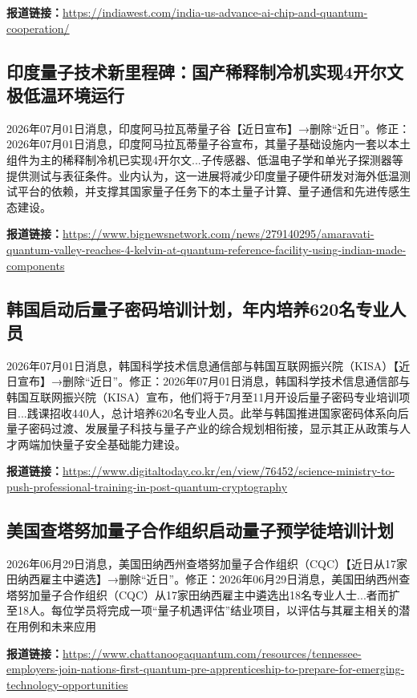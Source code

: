 \documentclass[12pt,a4paper]{ctexart}
\begin{document}
\noindent\textbf{报道链接：}\url{https://indiawest.com/india-us-advance-ai-chip-and-quantum-cooperation/}

\subsection{ 印度量子技术新里程碑：国产稀释制冷机实现4开尔文极低温环境运行 }

2026年07月01日消息，印度阿马拉瓦蒂量子谷【近日宣布】→删除“近日”。修正：2026年07月01日消息，印度阿马拉瓦蒂量子谷宣布，其量子基础设施内一套以本土组件为主的稀释制冷机已实现4开尔文...子传感器、低温电子学和单光子探测器等提供测试与表征条件。业内认为，这一进展将减少印度量子硬件研发对海外低温测试平台的依赖，并支撑其国家量子任务下的本土量子计算、量子通信和先进传感生态建设。

\noindent\textbf{报道链接：}\url{https://www.bignewsnetwork.com/news/279140295/amaravati-quantum-valley-reaches-4-kelvin-at-quantum-reference-facility-using-indian-made-components}

\subsection{ 韩国启动后量子密码培训计划，年内培养620名专业人员 }

2026年07月01日消息，韩国科学技术信息通信部与韩国互联网振兴院（KISA）【近日宣布】→删除“近日”。修正：2026年07月01日消息，韩国科学技术信息通信部与韩国互联网振兴院（KISA）宣布，他们将于7月至11月开设后量子密码专业培训项目...践课招收440人，总计培养620名专业人员。此举与韩国推进国家密码体系向后量子密码过渡、发展量子科技与量子产业的综合规划相衔接，显示其正从政策与人才两端加快量子安全基础能力建设。

\noindent\textbf{报道链接：}\url{https://www.digitaltoday.co.kr/en/view/76452/science-ministry-to-push-professional-training-in-post-quantum-cryptography}

\subsection{ 美国查塔努加量子合作组织启动量子预学徒培训计划 }

2026年06月29日消息，美国田纳西州查塔努加量子合作组织（CQC）【近日从17家田纳西雇主中遴选】→删除“近日”。修正：2026年06月29日消息，美国田纳西州查塔努加量子合作组织（CQC）从17家田纳西雇主中遴选出18名专业人士...者而扩至18人。每位学员将完成一项“量子机遇评估”结业项目，以评估与其雇主相关的潜在用例和未来应用

\noindent\textbf{报道链接：}\url{https://www.chattanoogaquantum.com/resources/tennessee-employers-join-nations-first-quantum-pre-apprenticeship-to-prepare-for-emerging-technology-opportunities}
\end{document}
